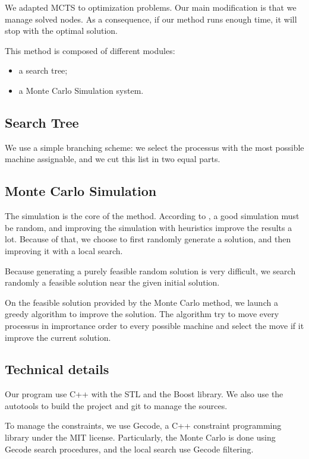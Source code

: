 \documentclass[a4paper,twocolumn]{article}
\begin{document}
We adapted MCTS to optimization problems. Our main modification is
that we manage solved nodes.  As a consequence, if our method runs
enough time, it will stop with the optimal solution.

This method is composed of different modules:
\begin{itemize}
\item a search tree;
\item a Monte Carlo Simulation system.
\end{itemize}

\subsection{Search Tree}

We use a simple branching scheme: we select the processus with the
most possible machine assignable, and we cut this list in two equal
parts.

\subsection{Monte Carlo Simulation}

The simulation is the core of the method.  According to
\cite{gelly2007contribution}, a good simulation must be random, and
improving the simulation with heuristics improve the results a lot.
Because of that, we choose to first randomly generate a solution, and
then improving it with a local search.

Because generating a purely feasible random solution is very
difficult, we search randomly a feasible solution near the given
initial solution.

On the feasible solution provided by the Monte Carlo method, we launch
a greedy algorithm to improve the solution.  The algorithm try to move
every processus in imprortance order to every possible machine and
select the move if it improve the current solution.

\subsection{Technical details}

Our program use C++ with the STL and the Boost library.  We also use
the autotools to build the project and git to manage the sources.

To manage the constraints, we use Gecode, a C++ constraint programming
library under the MIT license.  Particularly, the Monte Carlo is done
using Gecode search procedures, and the local search use Gecode
filtering.
\end{document}
